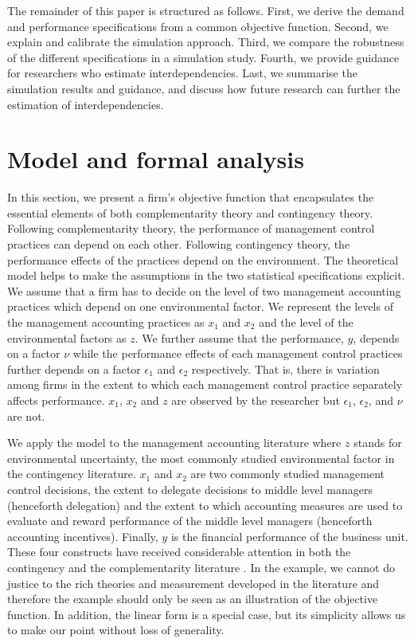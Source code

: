 \documentclass[12pt]{article}
\begin{document}
The remainder of this paper is structured as follows. First, we derive the demand and performance specifications from a common objective function. Second, we explain and calibrate the simulation approach. Third, we compare the robustness of the different specifications in a simulation study. Fourth, we provide guidance for researchers who estimate interdependencies. Last, we summarise the simulation results and guidance, and discuss how future research can further the estimation of interdependencies.

\section{Model and formal analysis}\label{model-and-formal-analysis}

In this section, we present a firm's objective function that encapsulates the essential elements of both complementarity theory and contingency theory. Following complementarity theory, the performance of management control practices can depend on each other. Following contingency theory, the performance effects of the practices depend on the environment. The theoretical model helps to make the assumptions in the two statistical specifications explicit. We assume that a firm has to decide on the level of two management accounting practices which depend on one environmental factor. We represent the levels of the management accounting practices as  $x_1$ and $x_2$ and the level of the environmental factors as $z$. We further assume that the performance, $y$, depends on a factor $\nu$ while the performance effects of each management control practices further depends on a factor $\epsilon_1$ and $\epsilon_2$ respectively. That is, there is variation among firms in the extent to which each management control practice separately affects performance. $x_1$, $x_2$ and $z$ are observed by the researcher but $\epsilon_1$, $\epsilon_2$, and $\nu$ are not. 

We apply the model to the management accounting literature where $z$ stands for environmental uncertainty, the most commonly studied environmental factor in the contingency literature. $x_1$ and $x_2$ are two commonly studied management control decisions, the extent to delegate decisions to middle level managers (henceforth delegation) and the extent to which accounting measures are used to evaluate and reward performance of the middle level managers (henceforth accounting incentives). Finally, $y$ is the financial performance of the business unit. These four constructs have received considerable attention in both the contingency and the complementarity literature \citep{grabner_management_2013,chenhall_management_2003, otley_contingency_2016}. In the example, we cannot do justice to the rich theories and measurement developed in the literature and therefore the example should only be seen as an illustration of the objective function. In addition, the linear form is a special case, but its simplicity allows us to make our point without loss of generality.
\end{document}
